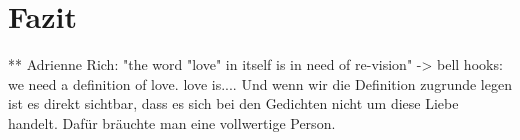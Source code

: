 \section{Fazit}

  ** Adrienne Rich: "the word "love" in itself is in need of re-vision"
  -> bell hooks: we need a definition of love.
  love is....
  Und wenn wir die Definition zugrunde legen ist es direkt sichtbar, dass es sich bei den Gedichten nicht um diese Liebe handelt.
  Dafür bräuchte man eine vollwertige Person.
\begin{comment}
    [Kolodny1980]

"What makes it so exciting, of course, is
that it can be constantly relearned and refined, so as to provide
either an individual or an entire reading community, over time,
with infinite variations of the same text. It can provide that, but,
I must add, too often it does not"
Quote Komilitonin mit: "universell menschliches fleischliches Begehren" -> und argue that we need critical feminist thinking education in order to shift perspectives in such readings.
Fast der ganze Kurs mit Ausnahme der Professorin und ein paar Studentinnen, die über das Durschnittsalter von 22 waren, scheinten mit der Leseweise kein Problem zu haben.
Ich frage mich was die selbe Person heute darüber sagen würde, wenn sie die Gedichte nochmal liest.

\end{comment}


